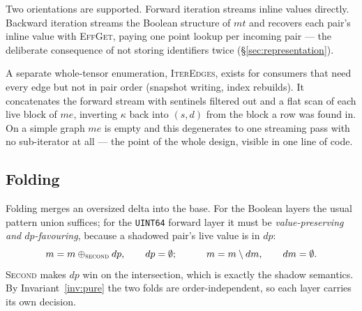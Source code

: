 \documentclass[11pt,a4paper]{article}
\theoremstyle{plain}
\theoremstyle{definition}
\theoremstyle{remark}
\begin{document}
Two orientations are supported. Forward iteration streams inline values
directly. Backward iteration streams the Boolean structure of $mt$ and
recovers each pair's inline value with \textsc{EffGet}, paying one point
lookup per incoming pair --- the deliberate consequence of not storing
identifiers twice (\S\ref{sec:representation}).

A separate whole-tensor enumeration, \textsc{IterEdges}, exists for
consumers that need every edge but not in pair order (snapshot writing, index
rebuilds). It concatenates the forward stream with sentinels filtered out and
a flat scan of each live block of $me$, inverting $\kappa$ back into $(s,d)$
from the block a row was found in.
On a simple graph $me$ is empty and this degenerates to one streaming pass
with no sub-iterator at all --- the point of the whole design, visible in one
line of code.

\subsection{Folding}
\label{sec:folding}

Folding merges an oversized delta into the base. For the Boolean layers the
usual pattern union suffices; for the \texttt{UINT64} forward layer it must
be \emph{value-preserving and $dp$-favouring}, because a shadowed pair's live
value is in $dp$:
\[
  m \mathrel{{=}} m \oplus_{\textsc{second}} dp, \qquad dp \mathrel{{=}} \emptyset;
  \qquad\quad m \mathrel{{=}} m \setminus dm, \qquad dm \mathrel{{=}} \emptyset .
\]
\textsc{Second} makes $dp$ win on the intersection, which is exactly the
shadow semantics. By Invariant~\ref{inv:pure} the two folds are
order-independent, so each layer carries its own decision.
\end{document}
